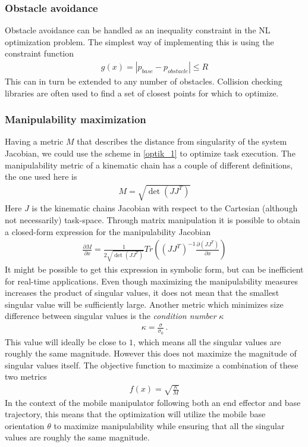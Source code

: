 \documentclass[times, utf8, diplomski, english]{fer}
\begin{document}
\subsubsection{Obstacle avoidance}
Obstacle avoidance can be handled as an inequality constraint in the NL optimization problem.
The simplest way of implementing this is using the constraint function
\begin{align}
g\left(x\right) = \left\vert p_{base} - p_{obstacle} \right\vert \leq R
\end{align}
This can in turn be extended to any number of obstacles.
Collision checking libraries are often used to find a set of closest points for which to optimize.
\subsubsection{Manipulability maximization}
Having a metric $M$ that describes the distance from singularity of the system Jacobian, we could use the scheme in \eqref{optik_1} to optimize task execution.
The manipulability metric of a kinematic chain has a couple of different definitions, the one used here is
\begin{align}
M = \sqrt{\det{\left(JJ^T\right)}}
\end{align}
Here $J$ is the kinematic chains Jacobian with respect to the Cartesian (although not necessarily) task-space.
Through matrix manipulation it is possible to obtain a closed-form expression for the manipulability Jacobian
\begin{align}
\frac{\partial M}{\partial x} = \frac{1}{2\sqrt{\det{\left(JJ^T\right)}}} Tr\left(\left(JJ^T\right)^{-1}\frac{\partial \left(JJ^T\right)}{\partial x}\right)
\end{align}
It might be possible to get this expression in symbolic form, but can be inefficient for real-time applications.
Even though maximizing the manipulability measures increases the product of singular values, it does not mean that the smallest singular value will be sufficiently large. 
Another metric which minimizes size difference between singular values is the \textit{condition number} $\kappa$
\begin{align}\label{eq:condition number}
\kappa = \frac{\sigma}{\sigma_0}\, .
\end{align}
This value will ideally be close to $1$, which means all the singular values are roughly the same magnitude.
However this does not maximize the magnitude of singular values itself.
The objective function to maximize a combination of these two metrics
\begin{align}
\label{mnptik_1}
f\left(x\right) = \sqrt{\frac{\kappa}{M}}
\end{align}
In the context of the mobile manipulator following both an end effector and base trajectory, this means that the optimization will utilize the mobile base orientation $\theta$ to maximize manipulability while ensuring that all the singular values are roughly the same magnitude.
\end{document}
